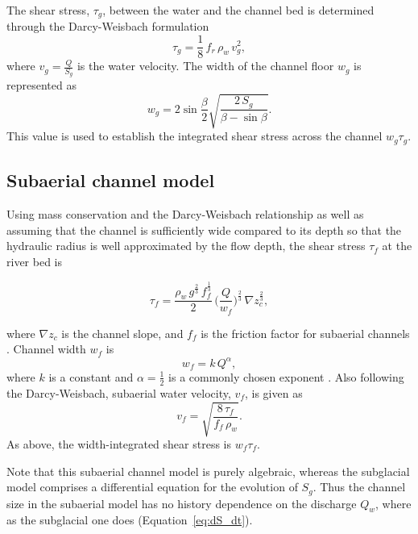 \documentclass[draft]{agujournal2019}
\begin{document}
The shear stress, $\tau_g$, between the water and the channel bed is determined through the Darcy-Weisbach formulation
\begin{equation}
  \label{eq:tau_g}
  \tau_g=\frac{1}{8}\,f_r\,\rho_w\,v_g^2,
\end{equation}
% 
where $v_g = \frac{Q}{S_g}$ is the water velocity.
% 
The width of the channel floor $w_g$ is represented as
\begin{equation}
  \label{eq:dh2wc}
  w_g = 2  \sin \frac{\beta}{2} \sqrt{\frac{2\, S_g}{\beta -\sin \beta}}.
\end{equation}
% 
This value is used to establish the integrated shear stress across the channel $w_g\tau_g$.

\subsection{Subaerial channel  model}
\label{sect:fluv}

Using mass conservation and the Darcy-Weisbach relationship as well as assuming that the channel is sufficiently wide compared to its depth so that the hydraulic radius is well approximated by the flow depth,
the shear stress $\tau_f$ at the river bed is
\begin{linenomath*}
  \begin{equation}
    \label{eq:DW_tau}
    \tau_f=\frac{\rho_w\,g^{\frac{2}{3}}\,f_f^{\frac{1}{3}}}{2}\, \Big(\frac{Q}{w_f} \Big)^{\frac{2}{3}} \,\nabla z_c^{\frac{2}{3}},
  \end{equation}
\end{linenomath*}
where $\nabla z_c$ is the channel slope, and $f_f$ is the friction factor for subaerial channels \cite{tucker1997}.
Channel width $w_f$ is
\begin{equation}
  \label{eq:wcf}
  w_f = k \, Q^{\alpha},
\end{equation}
% 
where $k$ is a constant and $\alpha=\frac{1}{2}$ is a commonly chosen exponent \cite{leopold1953}.
Also following the Darcy-Weisbach, subaerial water velocity, $v_f$, is given as
\begin{equation}
  \label{eq:vf}
  v_f = \sqrt{\frac{8\,\tau_f}{f_f\,\rho_w}}.
\end{equation}
% 
As above, the width-integrated shear stress is $w_f\tau_f$.

Note that this subaerial channel model is purely algebraic, whereas the subglacial model comprises a differential equation for the evolution of $S_g$.
Thus the channel size in the subaerial model has no history dependence on the discharge $Q_w$, where as the subglacial one does (Equation~\ref{eq:dS_dt}).
\end{document}
